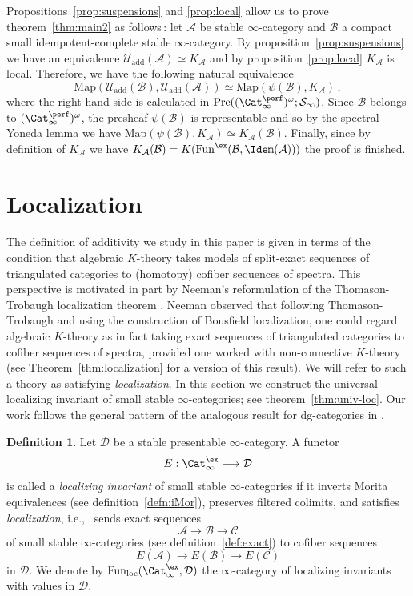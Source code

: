 \documentclass{amsart}
\newcommand{\cA}{{\mathcal A}}
\newcommand{\cB}{{\mathcal B}}
\newcommand{\cC}{{\mathcal C}}
\newcommand{\cD}{{\mathcal D}}
\newcommand{\cU}{{\mathcal U}}
\let\catsymbfont\mathcal
\newcommand{\aA}{{\catsymbfont{A}}}
\newcommand{\aB}{{\catsymbfont{B}}}
\newcommand{\aS}{{\catsymbfont{S}}}
\newcommand{\Pre}{\mathrm{Pre}}
\newcommand{\stabcat}{\Cat_\i^{\ex}}
\newcommand{\idemstabcat}{\Cat_\i^{\perf}}
\newcommand{\idemfun}{\Fun^{\ex}}
\newcommand{\Fun}{\mathrm{Fun}} %
\newcommand{\Map}{\mathrm{Map}}%
\newcommand{\ispec}{\aS_{\infty}}
\newcommand{\ie}{{i.e.,}\ }
\newcommand{\too}{\longrightarrow}%
\renewcommand{\i}{\infty}
\newcommand{\Umot}{\cU_{\mathrm{add}}}
\numberwithin{equation}{section}
\theoremstyle{definition}
\newtheorem{definition}[equation]{Definition}
\begin{document}
Propositions~\ref{prop:suspensions} and \ref{prop:local}
allow us to prove theorem~\ref{thm:main2} as follows\,: let $\aA$ be stable $\i$-category and $\aB$ a compact small idempotent-complete stable $\i$-category. By proposition~\ref{prop:suspensions}
we have an equivalence $\Umot(\cA)\simeq K_{\cA}$ and by
proposition~\ref{prop:local} $K_{\cA}$ is local.  Therefore, we have
the following natural equivalence
$$ \Map(\Umot(\cB), \Umot(\cA)) \simeq \Map(\psi(\cB), K_{\aA})\,,$$
where the right-hand side is calculated in
$\Pre((\idemstabcat)^{\omega}; \ispec)$. Since $\cB$ belongs to
$(\idemstabcat)^{\omega}$, the presheaf $\psi(\cB)$ is representable
and so by the spectral Yoneda lemma we have $\Map(\psi(\cB),
K_{\aA}) \simeq K_{\cA}(\cB)$. Finally, since by definition of
$K_{\aA}$ we have $K_{\aA}(\cB)=K(\idemfun(\cB, \Idem(\cA)))$ the
proof is finished.

\section{Localization}\label{sec:localization}

The definition of additivity we study in this paper is given in terms
of the condition that algebraic $K$-theory takes models of split-exact
sequences of triangulated categories to (homotopy) cofiber sequences
of spectra.  This perspective is motivated in part by Neeman's
reformulation of the Thomason-Trobaugh localization
theorem \cite{NeemanLoc}.  Neeman observed that following
Thomason-Trobaugh and using the construction of Bousfield
localization, one could regard algebraic $K$-theory as in fact taking
exact sequences of triangulated categories to cofiber sequences of
spectra, provided one worked with non-connective $K$-theory (see
Theorem~\ref{thm:localization} for a version of this result).  
We will refer to such a theory as satisfying {\em localization}.  In this
section we construct the universal localizing invariant of small
stable $\infty$-categories; see theorem~\ref{thm:univ-loc}.  Our work
follows the general pattern of the analogous result for dg-categories
in \cite{CisTab}.

\begin{definition}\label{def:loc-invariant}
Let $\cD$ be a stable presentable $\i$-category. A functor
$$ E: \stabcat \too \cD$$
is called a {\em localizing invariant} of small stable $\i$-categories
if it inverts Morita equivalences (see definition~\ref{defn:iMor}),
preserves filtered colimits, and satisfies {\em localization}, \ie
sends exact sequences
\[
\cA \too \cB \too \cC
\]
of small stable $\i$-categories (see definition~\ref{def:exact}) to cofiber sequences
\[
E(\cA) \too E(\cB) \too E(\cC)
\]
in $\cD$.
We denote by $\Fun_{\mathrm{loc}}(\stabcat, \cD)$ the $\i$-category of
localizing invariants with values in $\cD$.
\end{definition}
\end{document}
